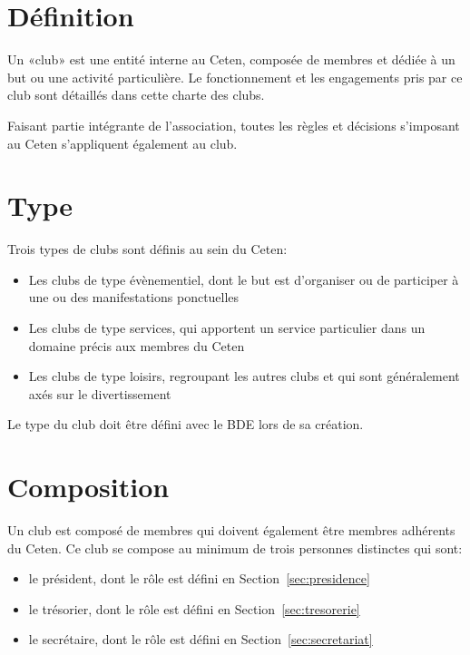\documentclass{article}
\begin{document}
	\begin{multicols}{2}
		
		\section{Définition}
\label{sec:definition}

		{\small
			
			Un «club» est une entité interne au Ceten, composée de membres et
			dédiée à un but ou une activité particulière. Le fonctionnement et
			les engagements pris par ce club sont détaillés dans cette charte
			des clubs.
			
			Faisant partie intégrante de l’association, toutes les règles et
			décisions s’imposant au Ceten s’appliquent également au club.
			
		}

		\section{Type}
\label{sec:type}
			
		{\small
		
			Trois types de clubs sont définis au sein du Ceten:
			\begin{itemize}
				\item Les clubs de type évènementiel, dont le but est
					d’organiser ou de participer à une ou des manifestations
					ponctuelles
				\item Les clubs de type services, qui apportent un service
					particulier dans un domaine précis aux membres du Ceten
				\item Les clubs de type loisirs, regroupant les autres clubs et
					qui sont généralement axés sur le divertissement
			\end{itemize}
			Le type du club doit être défini avec le BDE lors de sa création.
			
		}

		\section{Composition}
\label{sec:composition}

		{\small
		
			Un club est composé de membres qui doivent également être membres
			adhérents du Ceten. Ce club se compose au minimum de trois personnes
			distinctes qui sont:
			\begin{itemize}
				\item le président, dont le rôle est défini en
					Section~\ref{sec:presidence}
				\item le trésorier, dont le rôle est défini en
					Section~\ref{sec:tresorerie}
				\item le secrétaire, dont le rôle est défini en
					Section~\ref{sec:secretariat}
			\end{itemize}

}
\end{multicols}
\end{document}
